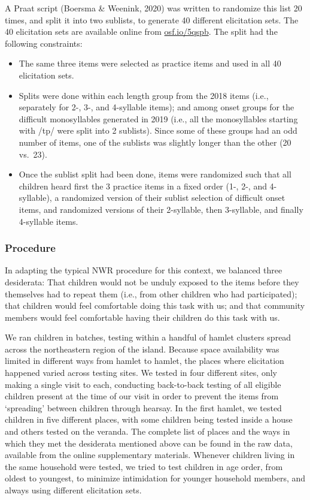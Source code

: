 \documentclass[english,,man,floatsintext]{apa6}
\providecommand{\tightlist}{%
  \setlength{\itemsep}{0pt}\setlength{\parskip}{0pt}}
\begin{document}
A Praat script (Boersma \& Weenink, 2020) was written to randomize this
list 20 times, and split it into two sublists, to generate 40 different
elicitation sets. The 40 elicitation sets are available online from
\href{https://osf.io/5qspb}{osf.io/5qspb}. The split had the following
constraints:

\begin{itemize}
\tightlist
\item
  The same three items were selected as practice items and used in all
  40 elicitation sets.
\item
  Splits were done within each length group from the 2018 items (i.e.,
  separately for 2-, 3-, and 4-syllable items); and among onset groups
  for the difficult monosyllables generated in 2019 (i.e., all the
  monosyllables starting with /tp/ were split into 2 sublists). Since
  some of these groups had an odd number of items, one of the sublists
  was slightly longer than the other (20 vs.~23).
\item
  Once the sublist split had been done, items were randomized such that
  all children heard first the 3 practice items in a fixed order (1-,
  2-, and 4-syllable), a randomized version of their sublist selection
  of difficult onset items, and randomized versions of their 2-syllable,
  then 3-syllable, and finally 4-syllable items.
\end{itemize}

\subsubsection{Procedure}\label{procedure}

In adapting the typical NWR procedure for this context, we balanced
three desiderata: That children would not be unduly exposed to the items
before they themselves had to repeat them (i.e., from other children who
had participated); that children would feel comfortable doing this task
with us; and that community members would feel comfortable having their
children do this task with us.

We ran children in batches, testing within a handful of hamlet clusters
spread across the northeastern region of the island. Because space
availability was limited in different ways from hamlet to hamlet, the
places where elicitation happened varied across testing sites. We tested
in four different sites, only making a single visit to each, conducting
back-to-back testing of all eligible children present at the time of our
visit in order to prevent the items from `spreading' between children
through hearsay. In the first hamlet, we tested children in five
different places, with some children being tested inside a house and
others tested on the veranda. The complete list of places and the ways
in which they met the desiderata mentioned above can be found in the raw
data, available from the online supplementary materials. Whenever
children living in the same household were tested, we tried to test
children in age order, from oldest to youngest, to minimize intimidation
for younger household members, and always using different elicitation
sets.
\end{document}
